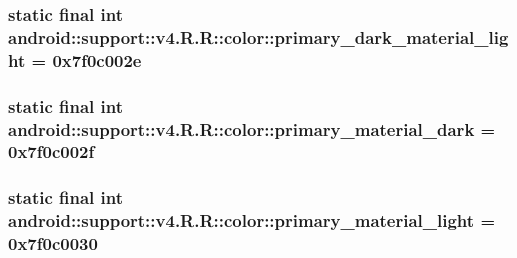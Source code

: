 \hypertarget{classandroid_1_1support_1_1v4_1_1_r_1_1color_e62e524d04c63868c5781bfea29b4c99}{
\subsubsection[{primary\_\-dark\_\-material\_\-light}]{\setlength{\rightskip}{0pt plus 5cm}static final int android::support::v4.R.R::color::primary\_\-dark\_\-material\_\-light = 0x7f0c002e}}
\label{classandroid_1_1support_1_1v4_1_1_r_1_1color_e62e524d04c63868c5781bfea29b4c99}


\hypertarget{classandroid_1_1support_1_1v4_1_1_r_1_1color_2fdef78c6f83e1a1f35fd1bfcffcc8fb}{
\subsubsection[{primary\_\-material\_\-dark}]{\setlength{\rightskip}{0pt plus 5cm}static final int android::support::v4.R.R::color::primary\_\-material\_\-dark = 0x7f0c002f}}
\label{classandroid_1_1support_1_1v4_1_1_r_1_1color_2fdef78c6f83e1a1f35fd1bfcffcc8fb}


\hypertarget{classandroid_1_1support_1_1v4_1_1_r_1_1color_a321096a05b73165ccbbc5bcd5682b7c}{
\subsubsection[{primary\_\-material\_\-light}]{\setlength{\rightskip}{0pt plus 5cm}static final int android::support::v4.R.R::color::primary\_\-material\_\-light = 0x7f0c0030}}
\label{classandroid_1_1support_1_1v4_1_1_r_1_1color_a321096a05b73165ccbbc5bcd5682b7c}


